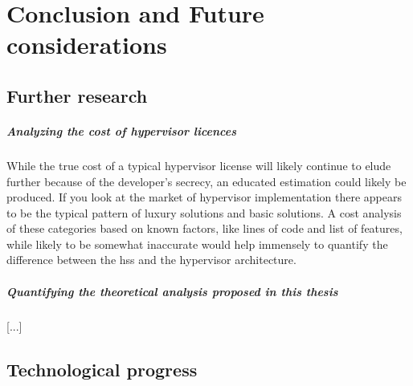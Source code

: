 
\chapter{Conclusion and Future considerations} %

\label{Chapter6} %




\section{Further research}
\paragraph{Analyzing the cost of hypervisor licences}
While the true cost of a typical hypervisor license will likely continue to elude further because of the developer's secrecy, an educated estimation could likely be produced. If you look at the market of hypervisor implementation there appears to be the typical pattern of luxury solutions and basic solutions. A cost analysis of these categories based on known factors, like lines of code and list of features, while likely to be somewhat inaccurate would help immensely to quantify the difference between the \acrshort{hss} and the hypervisor architecture.
\paragraph{Quantifying the theoretical analysis proposed in this thesis}
[...]

\section{Technological progress} \label{tech-progress}
